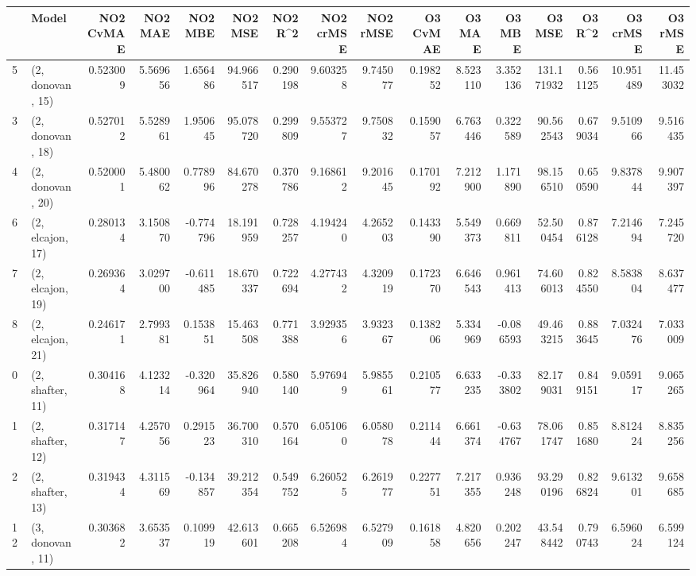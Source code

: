 \begin{tabular}{llrrrrrrrrrrrrrr}
\toprule
{} &             Model &  NO2 CvMAE &   NO2 MAE &   NO2 MBE &    NO2 MSE &   NO2 R\textasciicircum2 &  NO2 crMSE &  NO2 rMSE &  O3 CvMAE &     O3 MAE &    O3 MBE &      O3 MSE &    O3 R\textasciicircum2 &   O3 crMSE &    O3 rMSE \\
\midrule
5  &  (2, donovan, 15) &   0.523009 &  5.569656 &  1.656486 &  94.966517 &  0.290198 &   9.603258 &  9.745077 &  0.198252 &   8.523110 &  3.352136 &  131.171932 &  0.561125 &  10.951489 &  11.453032 \\
3  &  (2, donovan, 18) &   0.527012 &  5.528961 &  1.950645 &  95.078720 &  0.299809 &   9.553727 &  9.750832 &  0.159057 &   6.763446 &  0.322589 &   90.562543 &  0.679034 &   9.510966 &   9.516435 \\
4  &  (2, donovan, 20) &   0.520001 &  5.480062 &  0.778996 &  84.670278 &  0.370786 &   9.168612 &  9.201645 &  0.170192 &   7.212900 &  1.171890 &   98.156510 &  0.650590 &   9.837844 &   9.907397 \\
6  &  (2, elcajon, 17) &   0.280134 &  3.150870 & -0.774796 &  18.191959 &  0.728257 &   4.194240 &  4.265203 &  0.143390 &   5.549373 &  0.669811 &   52.500454 &  0.876128 &   7.214694 &   7.245720 \\
7  &  (2, elcajon, 19) &   0.269364 &  3.029700 & -0.611485 &  18.670337 &  0.722694 &   4.277432 &  4.320919 &  0.172370 &   6.646543 &  0.961413 &   74.606013 &  0.824550 &   8.583804 &   8.637477 \\
8  &  (2, elcajon, 21) &   0.246171 &  2.799381 &  0.153851 &  15.463508 &  0.771388 &   3.929356 &  3.932367 &  0.138206 &   5.334969 & -0.086593 &   49.463215 &  0.883645 &   7.032476 &   7.033009 \\
0  &  (2, shafter, 11) &   0.304168 &  4.123214 & -0.320964 &  35.826940 &  0.580140 &   5.976949 &  5.985561 &  0.210577 &   6.633235 & -0.333802 &   82.179031 &  0.849151 &   9.059117 &   9.065265 \\
1  &  (2, shafter, 12) &   0.317147 &  4.257056 &  0.291523 &  36.700310 &  0.570164 &   6.051060 &  6.058078 &  0.211444 &   6.661374 & -0.634767 &   78.061747 &  0.851680 &   8.812424 &   8.835256 \\
2  &  (2, shafter, 13) &   0.319434 &  4.311569 & -0.134857 &  39.212354 &  0.549752 &   6.260525 &  6.261977 &  0.227751 &   7.217355 &  0.936248 &   93.290196 &  0.826824 &   9.613201 &   9.658685 \\
12 &  (3, donovan, 11) &   0.303682 &  3.653537 &  0.109919 &  42.613601 &  0.665208 &   6.526984 &  6.527909 &  0.161858 &   4.820656 &  0.202247 &   43.548442 &  0.790743 &   6.596024 &   6.599124 \\

\end{tabular}
